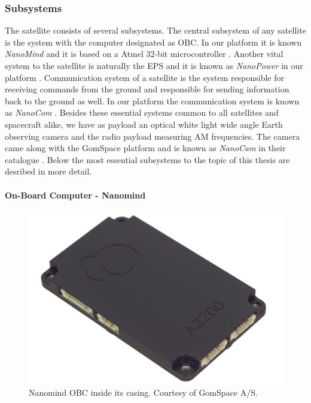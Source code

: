 \documentclass[english,12pt,a4paper,pdftex,elec,utf8]{aaltothesis}
\begin{document}
\subsubsection{Subsystems}
The satellite consists of several subsystems. The central subsystem of any satellite is the system with the computer designated as OBC. In our platform it is known \textit{NanoMind} and it is based on a Atmel 32-bit microcontroller \cite{nanomindds}. Another vital system to the satellite is naturally the EPS and it is known as \textit{NanoPower} in our platform \cite{nanopowerds}. Communication system of a satellite is the system responsible for receiving commands from the ground and responsible for sending information back to the ground as well. In our platform the communication system is known as \textit{NanoCom} \cite{nanocomds}. Besides these essential systems common to all satellites and spacecraft alike, we have as payload an optical white light wide angle Earth observing camera and the radio payload measuring AM frequencies. The camera came along with the GomSpace platform and is known as \textit{NanoCam} in their catalogue \cite{nanocamds}. Below the most essential subsystems to the topic of this thesis are desribed in more detail. 
\\
\\
\textbf{On-Board Computer - Nanomind}
\begin{figure}[h!]
\centering
\includegraphics[scale=0.2]{nanomind}
\caption{Nanomind OBC inside its casing. Courtesy of GomSpace A/S. \cite{nanomindds}}
\label{nanomind}
\end{figure}\par
\end{document}

